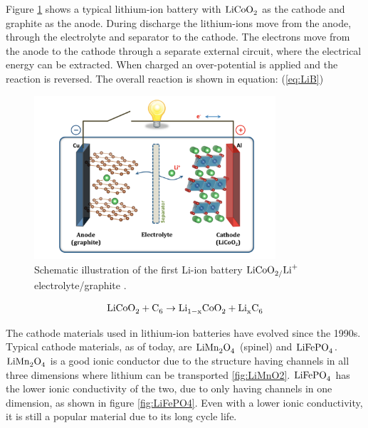 Figure \ref{fig:LiCoO2} shows a typical lithium-ion battery with $\ce{LiCoO_2}$ as the cathode and graphite as the anode. During discharge the lithium-ions move from the anode, through the electrolyte and separator to the cathode. The electrons move from the anode to the cathode through a separate external circuit, where the electrical energy can be extracted. When charged an over-potential is applied and the reaction is reversed. The overall reaction is shown in equation: (\ref{eq:LiB})

\begin{figure}[H]
    \centering
    \includegraphics[width=0.8\textwidth]{Li-ion_inter.png}
    \caption{Schematic illustration of the first Li-ion battery $\ce{LiCoO_2/Li^+}$ electrolyte/graphite \cite{goodenough2013li}.}
    \label{fig:LiCoO2}
\end{figure}

\begin{align}\label{eq:LiB}
\ce{LiCoO_2} + \ce{C_6} \rightarrow \ce{Li_{1-x}CoO_2} + \ce{Li_xC_6}
\end{align}

The cathode materials used in lithium-ion batteries have evolved since the 1990s. Typical cathode materials, as of today, are $\ce{LiMn_2O_4}$ (spinel) and $\ce{LiFePO_4}$. $\ce{LiMn_2O_4}$ is a good ionic conductor due to the structure having channels in all three dimensions where lithium can be transported \ref{fig:LiMnO2}. $\ce{LiFePO_4}$ has the lower ionic conductivity of the two, due to only having channels in one dimension, as shown in figure \ref{fig:LiFePO4}. Even with a lower ionic conductivity, it is still a popular material due to its long cycle life. 

